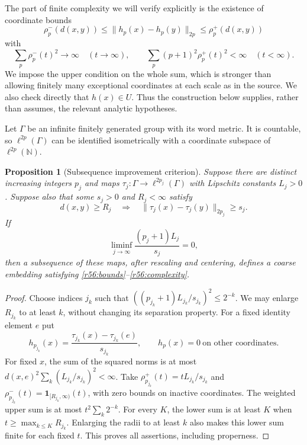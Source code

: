 \documentclass[11pt,a4paper]{article}
\newcommand{\N}{\mathbb{N}}
\newtheorem{notebookproposition}[notebooklemma]{Proposition}
\numberwithin{equation}{section}
\begin{document}
The part of finite complexity we will verify explicitly is the existence of coordinate bounds
\begin{equation}\label{r56:bounds}
 \rho_p^-(d(x,y))\leq\|h_p(x)-h_p(y)\|_{2p}
                      \leq\rho_p^+(d(x,y))
\end{equation}
with
\begin{equation}\label{r56:complexity}
 \sum_p\rho_p^-(t)^2\longrightarrow\infty\quad(t\to\infty),
 \qquad
 \sum_p(p+1)^2\rho_p^+(t)^2<\infty\quad(t<\infty).
\end{equation}
We impose the upper condition on the whole sum, which is stronger than allowing finitely many exceptional coordinates at each scale as in the source. We also check directly that $h(x)\in U$. Thus the construction below supplies, rather than assumes, the relevant analytic hypotheses.

Let $\Gamma$ be an infinite finitely generated group with its word metric. It is countable, so $\ell^{2p}(\Gamma)$ can be identified isometrically with a coordinate subspace of $\ell^{2p}(\N)$.

\begin{notebookproposition}[Subsequence improvement criterion]\label{r56:selection}
Suppose there are distinct increasing integers $p_j$ and maps
$\tau_j:\Gamma\to\ell^{2p_j}(\Gamma)$ with Lipschitz constants $L_j>0$. Suppose also that some $s_j>0$ and $R_j<\infty$ satisfy
\[
 d(x,y)\geq R_j\quad\Longrightarrow\quad
       \|\tau_j(x)-\tau_j(y)\|_{2p_j}\geq s_j.
\]
If
\begin{equation}\label{r56:missing}
 \liminf_{j\to\infty}\frac{(p_j+1)L_j}{s_j}=0,
\end{equation}
then a subsequence of these maps, after rescaling and centering, defines a coarse embedding satisfying \eqref{r56:bounds}--\eqref{r56:complexity}.
\end{notebookproposition}
\begin{proof}
Choose indices $j_k$ such that
$((p_{j_k}+1)L_{j_k}/s_{j_k})^2\leq2^{-k}$. We may enlarge $R_{j_k}$ to at least $k$, without changing its separation property. For a fixed identity element $e$ put
\[
 h_{p_{j_k}}(x)=\frac{\tau_{j_k}(x)-\tau_{j_k}(e)}{s_{j_k}},
 \qquad h_p(x)=0\ \text{on other coordinates}.
\]
For fixed $x$, the sum of the squared norms is at most
$d(x,e)^2\sum_k(L_{j_k}/s_{j_k})^2<\infty$.
Take $\rho_{p_{j_k}}^+(t)=tL_{j_k}/s_{j_k}$ and
$\rho_{p_{j_k}}^-(t)=\mathbf1_{[R_{j_k},\infty)}(t)$, with zero bounds on inactive coordinates. The weighted upper sum is at most $t^2\sum_k2^{-k}$. For every $K$, the lower sum is at least $K$ when $t\geq\max_{k\leq K}R_{j_k}$. Enlarging the radii to at least $k$ also makes this lower sum finite for each fixed $t$. This proves all assertions, including properness.
\end{proof}
\end{document}
